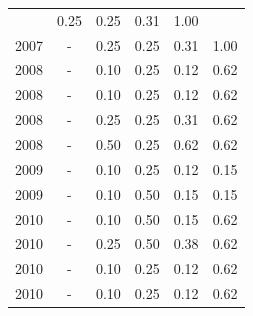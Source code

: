 \begin{table}[H]
\begin{tabular}{| l | c | c | c | c | c |}
          &
          0.25
          &
          0.25
          &
          0.31
          &
            {\color{blue} 1.00}
          \\
            2007
          &
          -
          &
          0.25
          &
          0.25
          &
          0.31
          &
            {\color{blue} 1.00}
          \\
\hline
            2008
          &
          -
          &
          0.10
          &
          0.25
          &
          0.12
          &
            {\color{blue} 0.62}
          \\
            2008
          &
          -
          &
          0.10
          &
          0.25
          &
          0.12
          &
            {\color{blue} 0.62}
          \\
            2008
          &
          -
          &
          0.25
          &
          0.25
          &
          0.31
          &
            {\color{blue} 0.62}
          \\
            2008
          &
          -
          &
          0.50
          &
          0.25
          &
          0.62
          &
            {\color{blue} 0.62}
          \\
\hline
            2009
          &
          -
          &
          0.10
          &
          0.25
          &
          0.12
          &
            {\color{red} 0.15}
          \\
            2009
          &
          -
          &
          0.10
          &
          0.50
          &
          0.15
          &
            {\color{red} 0.15}
          \\
\hline
            2010
          &
          -
          &
          0.10
          &
          0.50
          &
          0.15
          &
            {\color{blue} 0.62}
          \\
            2010
          &
          -
          &
          0.25
          &
          0.50
          &
          0.38
          &
            {\color{blue} 0.62}
          \\
            2010
          &
          -
          &
          0.10
          &
          0.25
          &
          0.12
          &
            {\color{blue} 0.62}
          \\
            2010
          &
          -
          &
          0.10
          &
          0.25
          &
          0.12
          &
            {\color{blue} 0.62}
          \\

\end{tabular}
\end{table}
